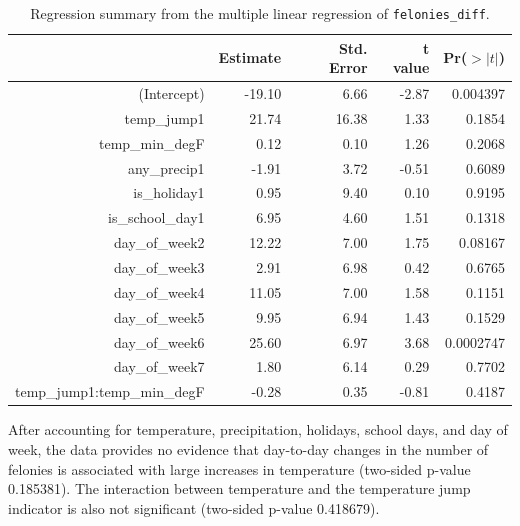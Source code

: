 \documentclass[11pt,notitlepage]{article}
\begin{document}
\begin{table}[ht]
\vspace*{-1mm}
\footnotesize
\centering
\begin{tabular}{rrrrr}
  \hline
 & Estimate & Std. Error & t value & Pr($>|t|$) \\ 
  \hline
(Intercept) & -19.10 & 6.66 & -2.87 & 0.004397 \\ 
  temp\_jump1 & 21.74 & 16.38 & 1.33 & 0.1854 \\ 
  temp\_min\_degF & 0.12 & 0.10 & 1.26 & 0.2068 \\ 
  any\_precip1 & -1.91 & 3.72 & -0.51 & 0.6089 \\ 
  is\_holiday1 & 0.95 & 9.40 & 0.10 & 0.9195 \\ 
  is\_school\_day1 & 6.95 & 4.60 & 1.51 & 0.1318 \\ 
  day\_of\_week2 & 12.22 & 7.00 & 1.75 & 0.08167 \\ 
  day\_of\_week3 & 2.91 & 6.98 & 0.42 & 0.6765 \\ 
  day\_of\_week4 & 11.05 & 7.00 & 1.58 & 0.1151 \\ 
  day\_of\_week5 & 9.95 & 6.94 & 1.43 & 0.1529 \\ 
  day\_of\_week6 & 25.60 & 6.97 & 3.68 & 0.0002747 \\ 
  day\_of\_week7 & 1.80 & 6.14 & 0.29 & 0.7702 \\ 
  temp\_jump1:temp\_min\_degF & -0.28 & 0.35 & -0.81 & 0.4187 \\ 
   \hline
\end{tabular}
\captionsetup{width=0.9\textwidth}
\vspace*{-2mm}
\caption{Regression summary from the multiple linear regression of \texttt{felonies_diff}.}
\label{tab:lmd2}   
\vspace*{-3mm}
\end{table}







After accounting for temperature, precipitation, holidays, school days, and day of week, the data provides no evidence that day-to-day changes in the number of felonies is associated with large increases in temperature (two-sided p-value 0.185381). The interaction between temperature and the temperature jump indicator is also not significant (two-sided p-value 0.418679).
\end{document}
